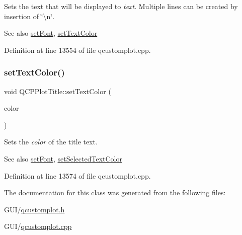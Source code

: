 Sets the text that will be displayed to {\itshape text}. Multiple lines can be created by insertion of \char`\"{}\textbackslash{}n\char`\"{}.

\begin{DoxySeeAlso}{See also}
\hyperlink{class_q_c_p_plot_title_a199fc7170802ea65006c371875349e37}{set\+Font}, \hyperlink{class_q_c_p_plot_title_a71273e3a0ca6b4c151591b37b9e5ce33}{set\+Text\+Color} 
\end{DoxySeeAlso}


Definition at line 13554 of file qcustomplot.\+cpp.

\mbox{\label{class_q_c_p_plot_title_a71273e3a0ca6b4c151591b37b9e5ce33}} 
\subsubsection{\texorpdfstring{set\+Text\+Color()}{setTextColor()}}
{\footnotesize\ttfamily void Q\+C\+P\+Plot\+Title\+::set\+Text\+Color (\begin{DoxyParamCaption}\item[{const Q\+Color \&}]{color }\end{DoxyParamCaption})}

Sets the {\itshape color} of the title text.

\begin{DoxySeeAlso}{See also}
\hyperlink{class_q_c_p_plot_title_a199fc7170802ea65006c371875349e37}{set\+Font}, \hyperlink{class_q_c_p_plot_title_a09ffd8c52ac8824d00382f84be391b66}{set\+Selected\+Text\+Color} 
\end{DoxySeeAlso}


Definition at line 13574 of file qcustomplot.\+cpp.



The documentation for this class was generated from the following files\+:\begin{DoxyCompactItemize}
\item 
G\+U\+I/\hyperlink{qcustomplot_8h}{qcustomplot.\+h}\item 
G\+U\+I/\hyperlink{qcustomplot_8cpp}{qcustomplot.\+cpp}\end{DoxyCompactItemize}
